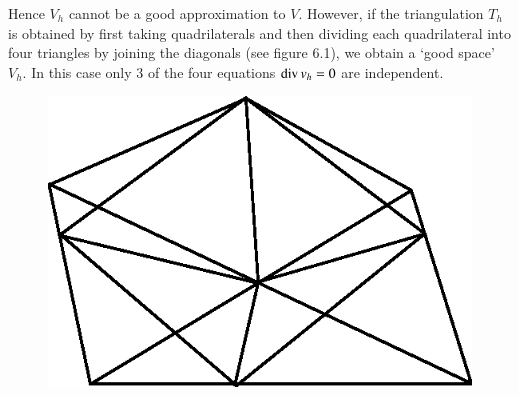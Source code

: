 \noindent Hence $V_h$ cannot be a good approximation to $V$. However,
if the triangulation $T_h$ is obtained by first taking quadrilaterals
and then dividing each quadrilateral into four triangles by joining
the diagonals (see figure 6.1), we obtain a `good space' $V_h$. In
this case only 3 of the four equations $\operatorname{div} v_h=0$ are independent. 
\begin{figure}[H]
\centering
\includegraphics{figure/fig6.1.eps}
\caption{}\label{fig6.1}
\end{figure}

